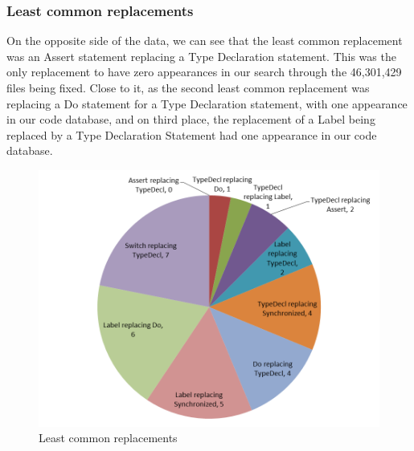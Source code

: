 \documentclass{sig-alternate-05-2015}
\begin{document}
\subsubsection{Least common replacements}
On the opposite side of the data, we can see that the least common replacement was an Assert statement replacing a Type Declaration statement. This was the only replacement to have zero appearances in our search through the 46,301,429 files being fixed. Close to it, as the second least common replacement was replacing a Do statement for a Type Declaration statement, with one appearance in our code database, and on third place, the replacement of a Label being replaced by a Type Declaration Statement had one appearance in our code database.

\begin{figure}[!t]
  \centering
\includegraphics[scale=0.5]{g2.png}
\caption{Least common replacements}
\end{figure}
\end{document}
